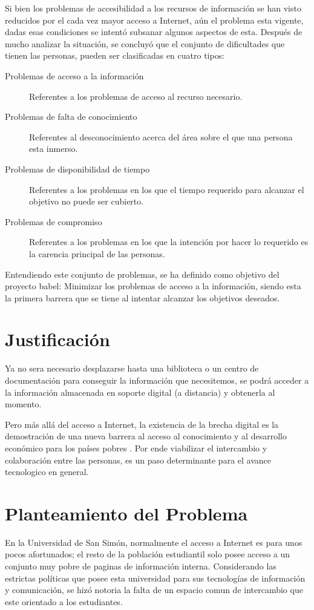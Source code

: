 \documentclass[letter,11pt,oneside,spanish]{article}
\begin{document}
Si bien los problemas de accesibilidad a los recursos de información se han
visto reducidos por el cada vez mayor acceso a Internet, aún el problema esta
vigente, dadas esas condiciones se intentó subsanar algunos aspectos de esta.
Después de mucho analizar la situación, se concluyó que el conjunto de
dificultades que tienen las personas, pueden ser clasificadas en cuatro tipos:

\begin{description}
\item [Problemas de acceso a la información]
    Referentes a los problemas de acceso al recurso necesario.
\item [Problemas de falta de conocimiento]
    Referentes al desconocimiento acerca del área sobre el que una persona esta
    inmerso.
\item [Problemas de disponibilidad de tiempo]
    Referentes a los problemas en los que el tiempo requerido para alcanzar
    el objetivo no puede ser cubierto.
\item [Problemas de compromiso]
    Referentes a los problemas en los que la intención por hacer lo requerido es
    la carencia principal de las personas.
\end{description}

Entendiendo este conjunto de problemas, se ha definido como objetivo del
proyecto babel: Minimizar los problemas de acceso a la información, siendo esta
la primera barrera que se tiene al intentar alcanzar los objetivos deseados.

\section{Justificación}
Ya no sera necesario desplazarse hasta una biblioteca o un centro de
documentación para conseguir la información que necesitemos, se podrá acceder a
la información almacenada en soporte digital (a distancia) y obtenerla al
momento.

Pero más allá del acceso a Internet, la existencia de la brecha digital es la
demostración de una nueva barrera al acceso al conocimiento y al desarrollo
económico para los países pobres \cite{brecha}. Por ende viabilizar el
intercambio y colaboración entre las personas, es un paso determinante para el
avance tecnologico en general.

\section{Planteamiento del Problema}
En la Universidad de San Simón, normalmente el acceso a Internet es para unos
pocos afortunados; el resto de la población estudiantil solo posee acceso a un
conjunto muy pobre de paginas de información interna. Considerando las estrictas
políticas que posee esta universidad para sus tecnologías de información y
comunicación, se hizó notoria la falta de un espacio comun de intercambio que
este orientado a los estudiantes.
\end{document}
